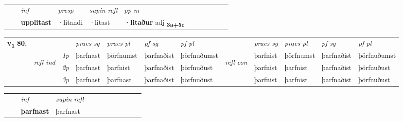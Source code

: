 \begin{tabular}{llllllllllll}
 & & \textit{inf}     & \textit{presp}  & \textit{supin refl} & \textit{pp m}     \\*
  & & \textbf{upplitast}      & ·litandi  & ·litast & \textbf{·litaður} adj \textbf{\textsubscript{3a+5c}} \\*
\cmidrule{1-12}
\end{tabular}



\begin{tabular}{llllllllllll} \toprule
\multirow{4}{*}{{{\textbf{v{\textsubscript{1}}} \Large{\textbf{80.}}}}}  & &   &  \textit{praes sg}  & \textit{praes pl}  &\textit{pf sg} & \textit{pf pl} &  &  \textit{praes sg}  & \textit{praes pl}  & \textit{pf sg} & \textit{pf pl } \\*
	\cmidrule{4-7} \cmidrule{9-12}
 &\multirow{3}{*}{\begin{turn}{90}\textit{refl ind}\end{turn}} & {\textit{1p}} & þarfnast & þörfnumst    & þarfnaðist & þörfnuðumst & \multirow{3}{*}{\begin{turn}{90}\textit{refl con}\end{turn}}  &þarfnist & þörfnumst & þarfnaðist & þörfnuðumst\\*
 &&  {\textit{2p}} &  þarfnast  & þarfnist   & þarfnaðist & þörfnuðust & &þarfnist & þarfnist & þarfnaðist & þörfnuðust \\*
& &  {\textit{3p}} & þarfnast & þarfnast   & þarfnaðist & þörfnuðust & & þarfnist & þarfnist& þarfnaðist & þörfnuðust  \\*
\cmidrule{4-7} \cmidrule{9-12}
\end{tabular}


\begin{tabular}{llllllllllll}
 & & \textit{inf}       & \textit{supin refl}      \\*
  & & \textbf{þarfnast}        & þarfnast  \\*
\cmidrule{1-12}
\end{tabular}



